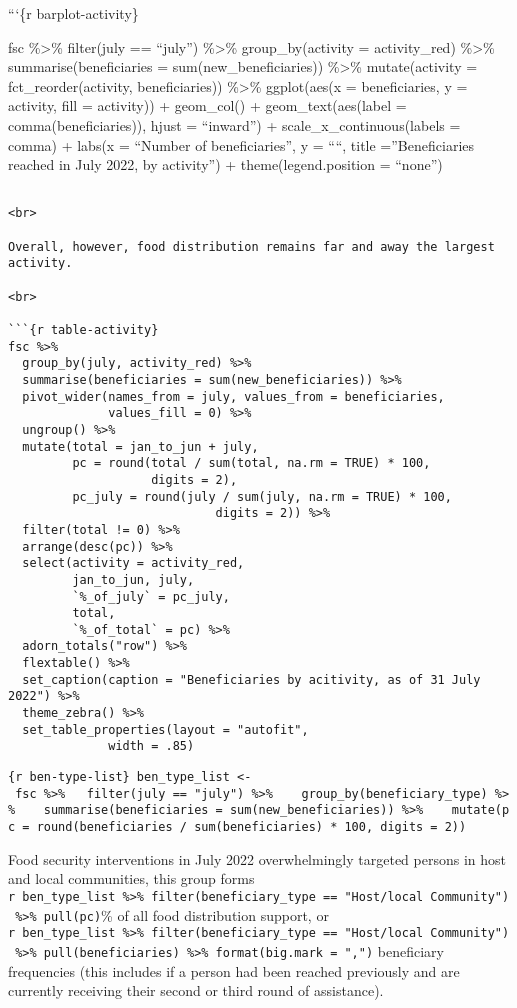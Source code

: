 \documentclass[
]{article}
\begin{document}
```\{r barplot-activity\}

fsc \%\textgreater\% filter(july == ``july'') \%\textgreater\%
group\_by(activity = activity\_red) \%\textgreater\%
summarise(beneficiaries = sum(new\_beneficiaries)) \%\textgreater\%
mutate(activity = fct\_reorder(activity, beneficiaries))
\%\textgreater\% ggplot(aes(x = beneficiaries, y = activity, fill =
activity)) + geom\_col() + geom\_text(aes(label = comma(beneficiaries)),
hjust = ``inward'') + scale\_x\_continuous(labels = comma) + labs(x =
``Number of beneficiaries'', y = ````, title =''Beneficiaries reached in
July 2022, by activity'') + theme(legend.position = ``none'')

\begin{verbatim}

<br>

Overall, however, food distribution remains far and away the largest activity. 

<br>

```{r table-activity}
fsc %>% 
  group_by(july, activity_red) %>% 
  summarise(beneficiaries = sum(new_beneficiaries)) %>% 
  pivot_wider(names_from = july, values_from = beneficiaries, 
              values_fill = 0) %>% 
  ungroup() %>% 
  mutate(total = jan_to_jun + july, 
         pc = round(total / sum(total, na.rm = TRUE) * 100, 
                    digits = 2), 
         pc_july = round(july / sum(july, na.rm = TRUE) * 100, 
                             digits = 2)) %>% 
  filter(total != 0) %>% 
  arrange(desc(pc)) %>% 
  select(activity = activity_red, 
         jan_to_jun, july, 
         `%_of_july` = pc_july, 
         total, 
         `%_of_total` = pc) %>% 
  adorn_totals("row") %>% 
  flextable() %>% 
  set_caption(caption = "Beneficiaries by acitivity, as of 31 July 2022") %>% 
  theme_zebra() %>% 
  set_table_properties(layout = "autofit",
              width = .85)

\end{verbatim}

\texttt{\{r\ ben-type-list\}\ ben\_type\_list\ \textless{}-\ fsc\ \%\textgreater{}\%\ \ \ filter(july\ ==\ "july")\ \%\textgreater{}\%\ \ \ \ group\_by(beneficiary\_type)\ \%\textgreater{}\%\ \ \ \ summarise(beneficiaries\ =\ sum(new\_beneficiaries))\ \%\textgreater{}\%\ \ \ \ mutate(pc\ =\ round(beneficiaries\ /\ sum(beneficiaries)\ *\ 100,\ digits\ =\ 2))}

Food security interventions in July 2022 overwhelmingly targeted persons
in host and local communities, this group forms
\texttt{r\ ben\_type\_list\ \%\textgreater{}\%\ filter(beneficiary\_type\ ==\ "Host/local\ Community")\ \%\textgreater{}\%\ pull(pc)}\%
of all food distribution support, or
\texttt{r\ ben\_type\_list\ \%\textgreater{}\%\ filter(beneficiary\_type\ ==\ "Host/local\ Community")\ \%\textgreater{}\%\ pull(beneficiaries)\ \%\textgreater{}\%\ format(big.mark\ =\ ",")}
beneficiary frequencies (this includes if a person had been reached
previously and are currently receiving their second or third round of
assistance).
\end{document}
